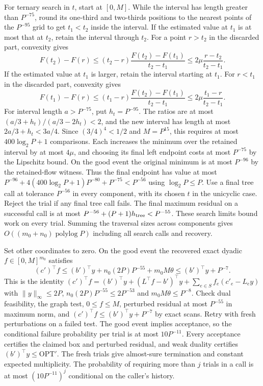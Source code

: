 \documentclass[11pt]{article}
\begin{document}
For ternary search in \(t\), start at \([0,M]\). While the interval has length greater than \(P^{-75}\), round its one-third and two-thirds positions to the nearest points of the \(P^{-95}\) grid to get \(t_1<t_2\) inside the interval. If the estimated value at \(t_1\) is at most that at \(t_2\), retain the interval through \(t_2\). For a point \(r>t_2\) in the discarded part, convexity gives
\[
 F(t_2)-F(r)\le
 (t_2-r)\frac{F(t_2)-F(t_1)}{t_2-t_1}
 \le 2\mu\frac{r-t_2}{t_2-t_1}.
\]
If the estimated value at \(t_1\) is larger, retain the interval starting at \(t_1\). For \(r<t_1\) in the discarded part, convexity gives
\[
 F(t_1)-F(r)\le
 (t_1-r)\frac{F(t_2)-F(t_1)}{t_2-t_1}
 \le 2\mu\frac{t_1-r}{t_2-t_1}.
\]
For interval length \(a>P^{-75}\), put \(h_t=P^{-95}\). The ratios are at most \((a/3+h_t)/(a/3-2h_t)<2\), and the new interval has length at most \(2a/3+h_t<3a/4\). Since \((3/4)^4<1/2\) and \(M=P^{15}\), this requires at most \(400\log_2 P+1\) comparisons. Each increases the minimum over the retained interval by at most \(4\mu\), and choosing its final left endpoint costs at most \(P^{-75}\) by the Lipschitz bound. On the good event the original minimum is at most \(P^{-96}\) by the retained-flow witness. Thus the final endpoint has value at most \(P^{-96}+4(400\log_2 P+1)P^{-80}+P^{-75}<P^{-56}\) using \(\log_2 P\le P\). Use a final tree call at tolerance \(P^{-56}\) in every component, with its chosen \(t\) in the unicyclic case. Reject the trial if any final tree call fails. The final maximum residual on a successful call is at most \(P^{-56}+(P+1)h_{\rm tree}<P^{-55}\). These search limits bound work on every trial. Summing the traversal sizes across components gives \(O((m_0+n_0)\operatorname{polylog} P)\) including all search calls and recovery.

Set other coordinates to zero. On the good event the recovered exact dyadic \(f\in[0,M]^{m_0}\) satisfies
\[
 (c')^\top f\le (b')^\top y+n_0(2P)P^{-55}+m_0M\theta
              \le (b')^\top y+P^{-7}.
\]
This is the identity \((c')^\top f=(b')^\top y+(L^\top f-b')^\top y+\sum_{e\in S} f_e(c'_e-L_e y)\) with \(\|y\|_\infty\le2P\), \(n_0(2P)P^{-55}\le2P^{-53}\) and \(m_0M\theta\le P^{-8}\). Check dual feasibility, the graph test, \(0\le f\le M\), perturbed residual at most \(P^{-55}\) in maximum norm, and \((c')^\top f\le(b')^\top y+P^{-7}\) by exact scans. Retry with fresh perturbations on a failed test. The good event implies acceptance, so the conditional failure probability per trial is at most \(10P^{-11}\). Every acceptance certifies the claimed box and perturbed residual, and weak duality certifies \((b')^\top y\le\mathrm{OPT}'\). The fresh trials give almost-sure termination and constant expected multiplicity. The probability of requiring more than \(j\) trials in a call is at most \((10P^{-11})^j\) conditional on the caller's history.
\end{document}
